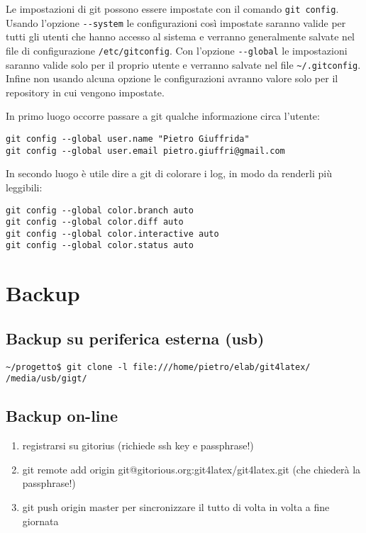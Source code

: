 \documentclass[a4paper,12pt,oneside]{article}
\begin{document}
Le impostazioni di git possono essere impostate con il comando
\lstinline|git config|. Usando l'opzione \lstinline|--system| le configurazioni
così impostate saranno valide per tutti gli utenti che hanno accesso al sistema
e verranno generalmente salvate nel file di configurazione
\lstinline|/etc/gitconfig|. Con l'opzione \lstinline|--global| le impostazioni
saranno valide solo per il proprio utente e verranno salvate nel file
\lstinline|~/.gitconfig|. Infine non usando alcuna opzione le configurazioni
avranno valore solo per il repository in cui vengono impostate.

In primo luogo occorre passare a git qualche informazione circa l'utente:
\begin{lstlisting}
git config --global user.name "Pietro Giuffrida"
git config --global user.email pietro.giuffri@gmail.com
\end{lstlisting}

In secondo luogo è utile dire a git di colorare i log, in modo da renderli più
leggibili:
\begin{lstlisting}
git config --global color.branch auto
git config --global color.diff auto
git config --global color.interactive auto
git config --global color.status auto
\end{lstlisting}

\section{Backup}
\subsection{Backup su periferica esterna (usb)}
\begin{lstlisting}
~/progetto$ git clone -l file:///home/pietro/elab/git4latex/ /media/usb/gigt/
\end{lstlisting}

\subsection{Backup on-line}

\begin{enumerate}
\item registrarsi su gitorius (richiede ssh key e passphrase!)
\item git remote add origin git@gitorious.org:git4latex/git4latex.git
(che chiederà la passphrase!)
\item git push origin master
per sincronizzare il tutto di volta in volta a fine giornata
\end{enumerate}
\end{document}
